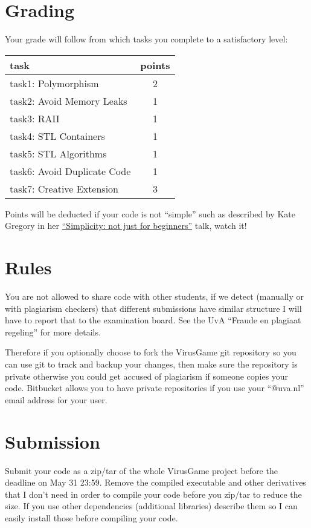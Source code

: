 \documentclass[12pt]{article}
\begin{document}
\section{Grading}
Your grade will follow from which tasks you complete to a satisfactory
level:
\begin{center}
\begin{tabular}{ |l|c| } 
  \hline
  \textbf{task}               &  \textbf{points}\\ \hline
  task1: Polymorphism         &               2 \\
  task2: Avoid Memory Leaks   &               1 \\
  task3: RAII                 &               1 \\
  task4: STL Containers       &               1 \\
  task5: STL Algorithms       &               1 \\
  task6: Avoid Duplicate Code &               1 \\
  task7: Creative Extension   &               3 \\
  \hline
\end{tabular}
\end{center}

Points will be deducted if your code is not ``simple'' such as
described by Kate Gregory in her
\href{https://www.youtube.com/watch?v=O50qTuM5OT0} {``Simplicity: not
  just for beginners''} talk, watch it!

\section{Rules}
You are not allowed to share code with other students, if we detect
(manually or with plagiarism checkers) that different submissions have
similar structure I will have to report that to the examination
board. See the UvA ``Fraude en plagiaat regeling'' for more details.

Therefore if you optionally choose to fork the VirusGame git
repository so you can use git to track and backup your changes, then
make sure the repository is private otherwise you could get accused of
plagiarism if someone copies your code. Bitbucket allows you to have
private repositories if you use your ``@uva.nl'' email address for your
user.

\section{Submission}
Submit your code as a zip/tar of the whole VirusGame project before
the deadline on May 31 23:59. Remove the compiled executable and other
derivatives that I don't need in order to compile your code before you
zip/tar to reduce the size. If you use other dependencies (additional
libraries) describe them so I can easily install those before
compiling your code.
\end{document}
